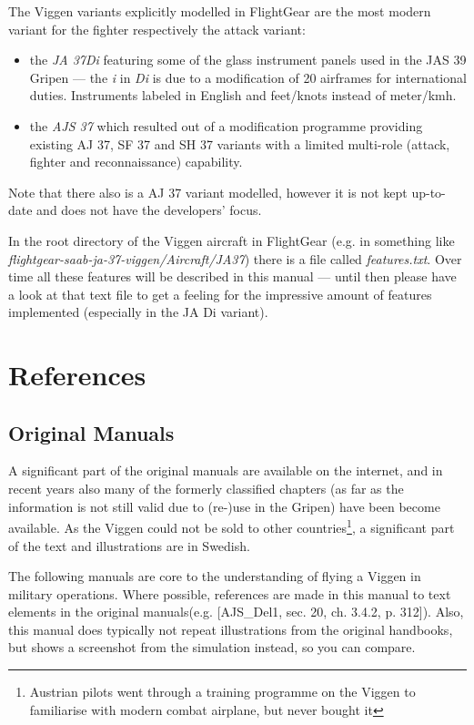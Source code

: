 The Viggen variants explicitly modelled in FlightGear are the most modern variant for the fighter respectively the attack variant:
\begin{itemize}
 \item the \emph{JA 37Di} featuring some of the glass instrument panels used in the JAS 39 Gripen --- the \emph{i} in \emph{Di} is due to a modification of 20 airframes for international duties. Instruments labeled in English and feet/knots instead of meter/kmh. 
 \item the \emph{AJS 37} which resulted out of a modification programme providing existing AJ 37, SF 37 and SH 37 variants with a limited multi-role (attack, fighter and reconnaissance) capability.
 \end{itemize}
 
 Note that there also is a AJ 37 variant modelled, however it is not kept up-to-date and does not have the developers' focus.
 
 In the root directory of the Viggen aircraft in FlightGear (e.g. in something like \emph{flightgear-saab-ja-37-viggen/Aircraft/JA37}) there is a file called \emph{features.txt}. Over time all these features will be described in this manual --- until then please have a look at that text file to get a feeling for the impressive amount of features implemented (especially in the JA Di variant).

\section{References}

\subsection{Original Manuals}
A significant part of the original manuals are available on the internet, and in recent years also many of the formerly classified chapters (as far as the information is not still valid due to (re-)use in the Gripen) have been become available. As the Viggen could not be sold to other countries\footnote{Austrian pilots went through a training programme on the Viggen to familiarise with modern combat airplane, but never bought it}, a significant part of the text and illustrations are in Swedish.

The following manuals are core to the understanding of flying a Viggen in military operations. Where possible, references are made in this manual to text elements in the original manuals(e.g. [AJS\_Del1, sec. 20, ch. 3.4.2, p. 312]). Also, this manual does typically not repeat illustrations from the original handbooks, but shows a screenshot from the simulation instead, so you can compare.

